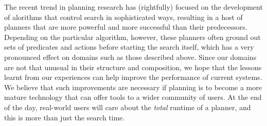 
The recent trend in planning research has (rightfully) focused on the
development of alorithms that control search in sophisticated ways,
resulting in a host of planners that are more powerful and more successful
than their predecessors. Depending on the particular algorithm, however,
these planners often ground out sets of predicates and actions before
starting the search itself, which has a very pronounced effect on domains
such as those described above. Since our domains are not that unusual in
their structure and composition, we hope that the lessons learnt from our
experiences can help improve the performance of current systems. We believe
that such improvements are necessary if planning is to become a more mature
technology that can offer tools to a wider community of users. At the end
of the day, real-world users will care about the \emph{total} runtime of a
planner, and this is more than just the search time.


